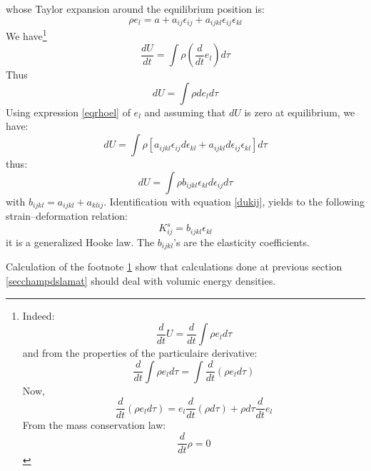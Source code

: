 \documentclass[12pt]{book}
\begin{document}
whose Taylor expansion around the equilibrium position is:
\begin{equation}\label{eqrhoel}
\rho e_l=a+a_{ij}\epsilon_{ij}+a_{ijkl}\epsilon_{ij}\epsilon_{kl}
\end{equation}
We have\footnote{\label{footdensi}Indeed:%
\begin{equation}
\frac{d}{dt}U=\frac{d}{dt}\int \rho e_l d\tau
\end{equation}
and from the properties of the particulaire derivative:
\begin{equation}
\frac{d}{dt}\int \rho e_l d\tau=\int\frac{d}{dt}( \rho e_l d\tau)
\end{equation}
Now,
\begin{equation}
\frac{d}{dt} (\rho e_ld\tau)=e_l\frac{d}{dt} (\rho d\tau) + \rho
d\tau\frac{d}{dt}e_l 
\end{equation}
From the mass conservation law:
\begin{equation}
\frac{d}{dt} \rho=0
\end{equation}
}%
\begin{equation}\label{eqdudt}
\frac{dU}{dt}=\int \rho (\frac{d}{dt}e_l) d\tau
\end{equation}
Thus
\begin{equation}
dU=\int \rho de_l d\tau
\end{equation}
Using expression \ref{eqrhoel} of $e_l$ and assuming that $dU$ is zero at
equilibrium, we have:
\begin{equation}
dU=\int \rho  [a_{ijkl}\epsilon_{ij}d\epsilon_{kl}+
a_{ijkl}d\epsilon_{ij}\epsilon_{kl}]d\tau 
\end{equation}
thus:
\begin{equation}
dU=\int \rho  b_{ijkl}\epsilon_{kl}d\epsilon_{ij}d\tau
\end{equation}
with $b_{ijkl}=a_{ijkl}+a_{klij}$. Identification with equation
\ref{dukij},  yields to the following strain--deformation relation:
\begin{equation}
K_{ij}^s=b_{ijkl}\epsilon_{kl}
\end{equation}
it is a generalized Hooke law. The $b_{ijkl}$'s are the
elasticity coefficients. 
\begin{rem}
Calculation of the footnote \ref{footdensi} show that calculations done at
previous section \ref{secchampdslamat} should deal with volumic energy
densities. 
\end{rem}
\end{document}

